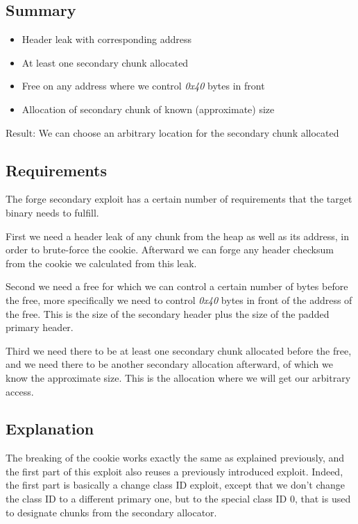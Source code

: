 \documentclass[a4paper,11pt,oneside]{report}
\begin{document}

\subsection{Summary}

\begin{itemize}
\item Header leak with corresponding address
\item At least one secondary chunk allocated
\item Free on any address where we control \emph{0x40} bytes in front
\item Allocation of secondary chunk of known (approximate) size
\end{itemize}

Result: We can choose an arbitrary location for the secondary chunk allocated

\subsection{Requirements}

The forge secondary exploit has a certain number of requirements that the target binary
needs to fulfill.

First we need a header leak of any chunk from the heap as well as its address, in
order to brute-force the cookie. Afterward we can forge any header checksum from the
cookie we calculated from this leak.

Second we need a free for which we can control a certain number of bytes before the free,
more specifically we need to control \emph{0x40} bytes in front of the address of the
free. This is the size of the secondary header plus the size of the padded primary header.

Third we need there to be at least one secondary chunk allocated before the free, and we
need there to be another secondary allocation afterward, of which we know the approximate
size. This is the allocation where we will get our arbitrary access.

\subsection{Explanation}


The breaking of the cookie works exactly the same as explained previously, and the first
part of this exploit also reuses a previously introduced exploit. Indeed, the first part is
basically a change class ID exploit, except that we don't change the class ID to a
different primary one, but to the special class ID 0, that is used to designate chunks
from the secondary allocator.
\end{document}
